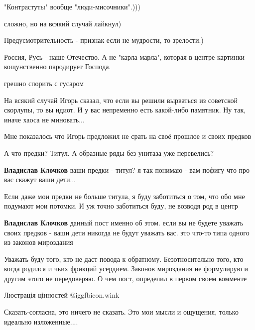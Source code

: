 \begin{itemize}

"Контрастуты" вообще "люди-мисочники".)))

\begin{itemize} %
сложно, но на всякий случай лайкнул)

Предусмотрительность - признак если не мудрости, то зрелости.)
\end{itemize} %


Россия, Русь - наше Отечество. А не "карла-марла", которая в центре картинки
кощунственно пародирует Господа.

\begin{itemize} %
грешно спорить с гусаром
\end{itemize} %


На всякий случай Игорь сказал, что если вы решили вырваться из советской
скорлупы, то вы идиот. И у вас непременно есть какой-либо памятник. Ну так,
иначе хаоса не миновать...

\begin{itemize} %
Мне показалось что Игорь предложил не срать на своё прошлое и своих предков

А что предки? Титул. А образные ряды без унитаза уже перевелись?

\textbf{Владислав Клочков} ваши предки - титул? я так понимаю - вам пофигу что про вас скажут ваши дети...


Если даже мои предки не больше титула, я буду заботиться о том, что обо мне
подумают мои потомки. И уж точно заботиться буду, не возводя род в центр

\textbf{Владислав Клочков} данный пост именно об этом. если вы не будете уважать своих предков - ваши дети никогда не будут уважать вас. это что-то типа одного из законов мироздания


Уважать буду того, кто не даст повода к обратному. Безотносительно того, кто
когда родился и чьих фрикций усердием. Законов мироздания не формулирую и
другим этого не передоверяю. О чем пост, определил в первом своем комменте

\end{itemize} %


Люстрація цінностей  @igg{fbicon.wink} 


Сказать-согласна, это ничего не сказать. Это мои мысли и ощущения, только идеально изложенные....

\end{itemize} %
